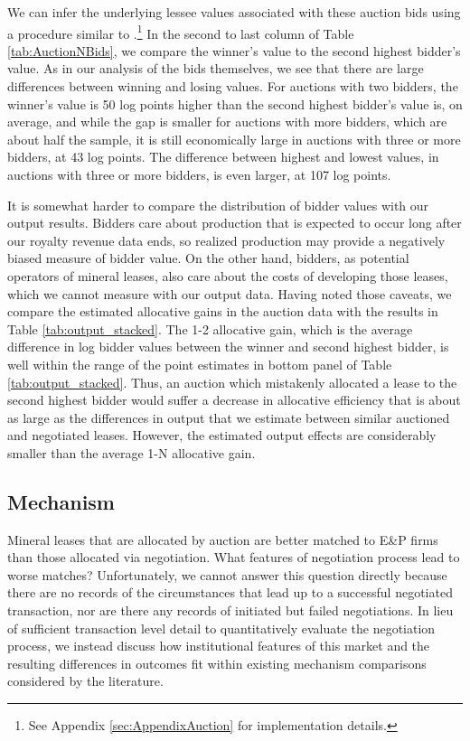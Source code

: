 \documentclass[12pt]{article}
\begin{document}
We can infer the underlying lessee values associated with these auction bids using a procedure similar to \cite{roberts2013unobserved}.\footnote{See Appendix \ref{sec:AppendixAuction} for implementation details.}  In the second to last column of Table \ref{tab:AuctionNBids}, we compare the winner's value to the second highest bidder's value.  As in our analysis of the bids themselves, we see that there are large differences between winning and losing values. For auctions with two bidders, the winner's value is 50 log points higher than the second highest bidder's value is, on average, and while the gap is smaller for auctions with more bidders, which are about half the sample, it is still economically large in auctions with three or more bidders, at 43 log points.  The difference between highest and lowest values, in auctions with three or more bidders, is even larger, at 107 log points.

It is somewhat harder to compare the distribution of bidder values with our output results. Bidders care about production that is expected to occur long after our royalty revenue data ends, so realized production may provide a negatively biased measure of bidder value.  On the other hand, bidders, as potential operators of mineral leases, also care about the costs of developing those leases, which we cannot measure with our output data.  Having noted those caveats, we compare the estimated allocative gains in the auction data with the results in Table \ref{tab:output_stacked}.  The 1-2 allocative gain, which is the average difference in log bidder values between the winner and second highest bidder, is well within the range of the point estimates in bottom panel of Table \ref{tab:output_stacked}.  Thus, an auction which mistakenly allocated a lease to the second highest bidder would suffer a decrease in allocative efficiency that is about as large as the differences in output that we estimate between similar auctioned and negotiated leases. However, the estimated output effects are considerably smaller than the average 1-N allocative gain.  

\addtolength{\tabcolsep}{10pt}

\subsection{Mechanism}

Mineral leases that are allocated by auction are better matched to E\&P firms than those allocated via negotiation. What features of negotiation process lead to worse matches? Unfortunately, we cannot answer this question directly because there are no records of the circumstances that lead up to a successful negotiated transaction, nor are there any records of initiated but failed negotiations. In lieu of sufficient transaction level detail to quantitatively evaluate the negotiation process, we instead discuss how institutional features of this market and the resulting differences in outcomes fit within existing mechanism comparisons considered by the literature.  
\end{document}

